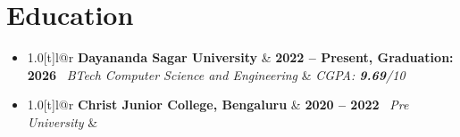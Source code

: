 \documentclass[a4paper]{extarticle}
\makeatletter
\renewcommand\normalsize{\fontsize{9}{11}\selectfont}
\newcommand{\resumeItem}[1]{
  \item\normalsize{
    {#1 \vspace{-2pt}}
  }
}
\newcommand{\resumeSubheading}[4]{
  \vspace{-2pt}\item
    \begin{tabular*}{1.0\textwidth}[t]{l@{\extracolsep{\fill}}r}
      \textbf{#1} & \textbf{\small #2} \
      \textit{\small#3} & \textit{\small #4} \
    \end{tabular*}\vspace{-7pt}
}
\newcommand{\resumeSubHeadingListStart}{\begin{itemize}[leftmargin=0.0in, label={}]}
\newcommand{\resumeSubHeadingListEnd}{\end{itemize}}
\newcommand{\resumeItemListStart}{\begin{itemize}}
\newcommand{\resumeItemListEnd}{\end{itemize}\vspace{-8pt}}
\makeatother
\begin{document}
\vspace{-13 pt}    
\section{Education}
  \resumeSubHeadingListStart
    \resumeSubheading
      {Dayananda Sagar University}{2022 -- Present, Graduation: 2026}
      {BTech Computer Science and Engineering}{CGPA: \textbf{9.69}/10}
    \resumeSubheading
      {Christ Junior College, Bengaluru}{2020 -- 2022}
      {Pre University}{}
  \resumeSubHeadingListEnd
 
\end{document}
